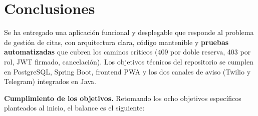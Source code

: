 \documentclass[12pt,a4paper]{report}
\begin{document}
\chapter{Conclusiones}

Se ha entregado una aplicación funcional y desplegable que responde al problema de gestión de citas, con arquitectura clara, código mantenible y \textbf{pruebas automatizadas} que cubren los caminos críticos (409 por doble reserva, 403 por rol, JWT firmado, cancelación). Los objetivos técnicos del repositorio se cumplen en PostgreSQL, Spring Boot, frontend PWA y los dos canales de aviso (Twilio y Telegram) integrados en Java.

\textbf{Cumplimiento de los objetivos.} Retomando los ocho objetivos específicos planteados al inicio, el balance es el siguiente:
\end{document}
